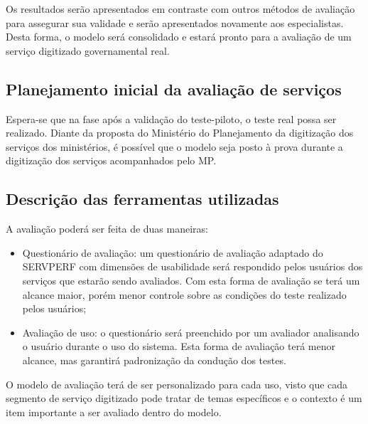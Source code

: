 	Os resultados serão apresentados em contraste com outros métodos de avaliação para assegurar sua validade e serão apresentados novamente aos especialistas. Desta forma, o modelo será consolidado e estará pronto para a avaliação de um serviço digitizado governamental real.

	\subsection{Planejamento inicial da avaliação de serviços}
	Espera-se que na fase após a validação do teste-piloto, o teste real possa ser realizado. Diante da proposta do Ministério do Planejamento da digitização dos serviços dos ministérios, é possível que o modelo seja posto à prova durante a digitização dos serviços acompanhados pelo MP.

	\subsection{Descrição das ferramentas utilizadas}
	A avaliação poderá ser feita de duas maneiras:
	\begin{itemize}
		\item Questionário de avaliação: um questionário de avaliação adaptado do SERVPERF com dimensões de usabilidade será respondido pelos usuários dos serviços que estarão sendo avaliados. Com esta forma de avaliação se terá um alcance maior, porém menor controle sobre as condições do teste realizado pelos usuários;
		
		\item Avaliação de uso: o questionário será preenchido por um avaliador analisando o usuário durante o uso do sistema. Esta forma de avaliação terá menor alcance, mas garantirá padronização da condução dos testes.
	\end{itemize}

	O modelo de avaliação terá de ser personalizado para cada uso, visto que cada segmento de serviço digitizado pode tratar de temas específicos e o contexto é um item importante a ser avaliado dentro do modelo.